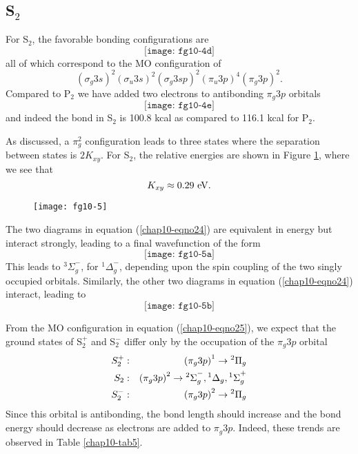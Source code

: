 \subsection{S$_2$}

For S$_2$, the favorable bonding configurations are
\begin{equation}
\texttt{[image: fg10-4d]}
\label{chap10-eqno24}
\end{equation}
all of which correspond to the MO configuration of
\begin{equation}
\left( \sigma_g 3s \right)^2 \left( \sigma_u 3s \right)^2 \left( \sigma_g 
3sp \right)^2 \left( \pi_u 3p  \right)^4 \left( \pi_g 3p \right)^2 
.
\label{chap10-eqno25}
\end{equation}
Compared to P$_2$ we have added two electrons to antibonding $\pi_g3p$ orbitals
\begin{equation}
\texttt{[image: fg10-4e]}
\end{equation}
and indeed the bond in S$_2$ is 100.8 kcal as compared to 116.1 kcal for 
P$_2$.

As discussed, a $\pi^2_g$ configuration leads to three states
where the separation between states is $2K_{xy}$.  For S$_2$, the relative 
energies are shown in Figure \ref{chap10-fig5}, where we see that
\begin{equation}
K_{xy} \approx 0.29~{\rm eV} .
\end{equation}

\begin{figure}
\texttt{[image: fg10-5]}
\caption{}
\label{chap10-fig5}
\end{figure}

The two diagrams in equation (\ref{chap10-eqno24}) are equivalent in
energy but interact strongly, leading to a final wavefunction of the
form
\begin{equation}
\texttt{[image: fg10-5a]}
\label{chap10-eqno26}
\end{equation}
This leads to ${^3\Sigma}^-_g$, for ${^1\Delta}^-_g$, depending upon
the spin coupling of the two singly occupied orbitals.  Similarly, the
other two diagrams in equation (\ref{chap10-eqno24}) interact, leading
to
\begin{equation}
\texttt{[image: fg10-5b]}
\end{equation}

From the MO configuration in equation (\ref{chap10-eqno25}), we expect 
that the ground states of S$^+_2$ and S$^-_2$ 
differ only by the occupation of the $\pi_g3p$ orbital
\begin{eqnarray}
S^+_2 &:& \left( \pi_g 3p \right)^1 \rightarrow {^2\Pi}_g\cr
S_2  &:& \left( \pi_g 3p \right)^2 \rightarrow {^2\Sigma}^-_g , {^1\Delta}_g , 
{^1\Sigma}^+_g\cr
S^-_2 &:& \left( \pi_g 3p \right)^2 \rightarrow {^2\Pi}_g
\end{eqnarray}
Since this orbital is antibonding, the bond length should increase and
the bond energy should decrease as electrons are added to $\pi_g3p$.
Indeed, these trends are observed in Table \ref{chap10-tab5}.

